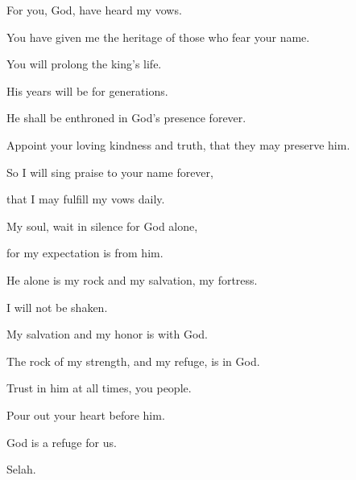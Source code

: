 {\Q {}For you, God, have heard my vows.
\par }{\QB You have given me the heritage of those who fear your name.
\par }{\Q {}You will prolong the king’s life.
\par }{\QB His years will be for generations.
\par }{\Q {}He shall be enthroned in God’s presence forever.
\par }{\QB Appoint your loving kindness and truth, that they may preserve him.
\par }{\Q {}So I will sing praise to your name forever,
\par }{\QB that I may fulfill my vows daily.

\par }
{\Q {}My soul, wait in silence for God alone,
\par }{\QB for my expectation is from him.
\par }{\Q {}He alone is my rock and my salvation, my fortress.
\par }{\QB I will not be shaken.
\par }{\Q {}My salvation and my honor is with God.
\par }{\QB The rock of my strength, and my refuge, is in God.
\par }{\Q {}Trust in him at all times, you people.
\par }{\QB Pour out your heart before him.
\par }{\QB God is a refuge for us.
\par }{\QS Selah.\par }
